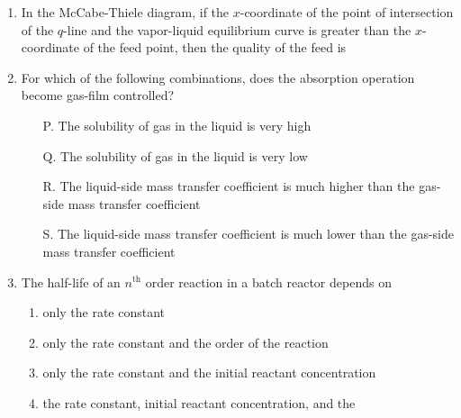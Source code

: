 \documentclass[journal,12pt,onecolumn]{IEEEtran}
\theoremstyle{remark}
\begin{document}
\begin{enumerate}
    \item In the McCabe-Thiele diagram, if the $x$-coordinate of the point of intersection of the $q$-line and the vapor-liquid equilibrium curve is greater than the $x$-coordinate of the feed point, then the quality of the feed is
    \hfill{}
    \begin{enumerate}
\end{enumerate}

    \item For which of the following combinations, does the absorption operation become gas-film controlled?
\hfill{}
    \begin{enumerate}
        \item[P.] The solubility of gas in the liquid is very high
        \item[Q.] The solubility of gas in the liquid is very low
        \item[R.] The liquid-side mass transfer coefficient is much higher than the gas-side mass transfer coefficient
        \item[S.] The liquid-side mass transfer coefficient is much lower than the gas-side mass transfer coefficient
    \end{enumerate}
    \begin{enumerate}
    \end{enumerate}

    \item The half-life of an $n^{\text{th}}$ order reaction in a batch reactor depends on
    \hfill{}
    \begin{enumerate}
        \item only the rate constant
        \item only the rate constant and the order of the reaction
        \item only the rate constant and the initial reactant concentration
        \item the rate constant, initial reactant concentration, and the
\end{enumerate}


\end{enumerate}
\end{document}
